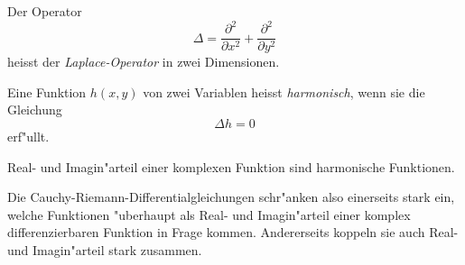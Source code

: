 \begin{definition}
Der Operator 
\[
\Delta =
\frac{\partial^2}{\partial x^2}
+
\frac{\partial^2}{\partial y^2}
\]
heisst der {\em Laplace-Operator} in zwei Dimensionen.
%
\end{definition}

\begin{definition}
Eine Funktion $h(x,y)$ von zwei Variablen heisst {\em harmonisch}, wenn sie
die Gleichung
\[
\Delta h=0
\]
erf"ullt.
%
%
\end{definition}

\begin{satz}
Real- und Imagin"arteil einer komplexen Funktion sind harmonische Funktionen.
\end{satz}

Die Cauchy-Riemann-Differentialgleichungen schr"anken also einerseits stark
ein, welche Funktionen "uberhaupt als Real- und Imagin"arteil einer
komplex differenzierbaren Funktion in Frage kommen.
Andererseits koppeln sie auch Real- und Imagin"arteil stark zusammen.

